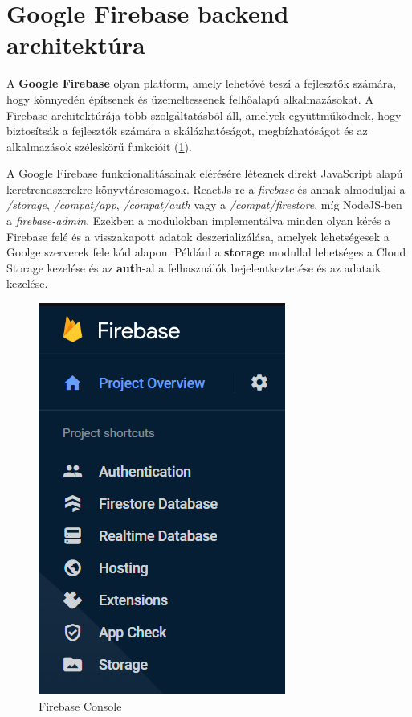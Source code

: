 \section {Google Firebase backend architektúra} \label{firebase}

A \textbf{Google Firebase} olyan platform, amely lehetővé teszi a fejlesztők számára, hogy könnyedén építsenek és üzemeltessenek felhőalapú alkalmazásokat. A Firebase architektúrája több szolgáltatásból áll, amelyek együttműködnek, hogy biztosítsák a fejlesztők számára a skálázhatóságot, megbízhatóságot és az alkalmazások széleskörű funkcióit (\ref{abra:firebaseConsole}).

A Google Firebase funkcionalitásainak elérésére léteznek direkt JavaScript alapú keretrendszerekre könyvtárcsomagok. ReactJs-re a \textit{firebase} és annak almoduljai a \textit{/storage}, \textit{/compat/app}, \textit{/compat/auth} vagy a \textit{/compat/firestore}, míg NodeJS-ben a \textit{firebase-admin}. Ezekben a modulokban implementálva minden olyan kérés a Firebase felé és a visszakapott adatok deszerializálása, amelyek lehetségesek a Goolge szerverek fele kód alapon. Például a \textbf{storage} modullal lehetséges a Cloud Storage kezelése és az \textbf{auth}-al a felhasználók bejelentkeztetése és az adataik kezelése.

\begin{figure}[!h]
	\centering
	\includegraphics[scale=0.6]{images/firebaseConsole}
	\caption{Firebase Console}
	\label{abra:firebaseConsole}
\end{figure}
\pagebreak

